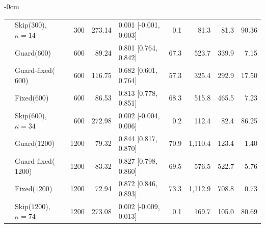 \documentclass[mathematics,supfile,submit,moreauthors]{Definitions/mdpi}
\newcommand{\devnum}[1]{#1}
\begin{document}
\begin{table}[H]
\begin{adjustwidth}{-\extralength}{0cm}
\begin{tabular}{llrrlrrrr}
 & Skip($\devnum{300}$), $\kappa=14$ & \devnum{300} & \devnum{273.14} & \devnum{0.001 [-0.001, 0.003]} & \devnum{0.1} & \devnum{81.3} & \devnum{81.3} & \devnum{90.36} \\
 & Guard($\devnum{600}$)      & \devnum{600} & \devnum{89.24} & \devnum{0.801 [0.764, 0.842]} & \devnum{67.3} & \devnum{523.7} & \devnum{339.9} & \devnum{7.15} \\
 & Guard-fixed($\devnum{600}$) & \devnum{600} & \devnum{116.75} & \devnum{0.682 [0.601, 0.764]} & \devnum{57.3} & \devnum{325.4} & \devnum{292.9} & \devnum{17.50} \\
 & Fixed($\devnum{600}$)      & \devnum{600} & \devnum{86.53} & \devnum{0.813 [0.778, 0.851]} & \devnum{68.3} & \devnum{515.8} & \devnum{465.5} & \devnum{7.23} \\
 & Skip($\devnum{600}$), $\kappa=34$ & \devnum{600} & \devnum{272.98} & \devnum{0.002 [-0.004, 0.006]} & \devnum{0.2} & \devnum{112.4} & \devnum{82.4} & \devnum{86.25} \\
 & Guard($\devnum{1200}$)     & \devnum{1200} & \devnum{79.32} & \devnum{0.844 [0.817, 0.870]} & \devnum{70.9} & \devnum{1{,}110.4} & \devnum{123.4} & \devnum{1.40} \\
 & Guard-fixed($\devnum{1200}$) & \devnum{1200} & \devnum{83.32} & \devnum{0.827 [0.798, 0.860]} & \devnum{69.5} & \devnum{576.5} & \devnum{522.7} & \devnum{5.76} \\
 & Fixed($\devnum{1200}$)     & \devnum{1200} & \devnum{72.94} & \devnum{0.872 [0.846, 0.893]} & \devnum{73.3} & \devnum{1{,}112.9} & \devnum{708.8} & \devnum{0.73} \\
 & Skip($\devnum{1200}$), $\kappa=74$ & \devnum{1200} & \devnum{273.08} & \devnum{0.002 [-0.009, 0.013]} & \devnum{0.1} & \devnum{169.7} & \devnum{105.0} & \devnum{80.69} \\
\bottomrule
\end{tabular}
\end{adjustwidth}
\end{table}
\end{document}
